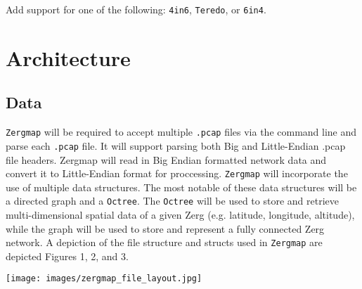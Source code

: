 \documentclass[12pt]{article}
\begin{document}
Add support for one of the following: \lstinline|4in6|, \lstinline|Teredo|, or \lstinline|6in4|.
\pagebreak %

\section{Architecture}
\subsection{Data}

\lstinline|Zergmap| will be required to accept multiple \lstinline|.pcap| files via the command line and parse each \lstinline|.pcap| file. It will support parsing both Big and Little-Endian .pcap file headers. Zergmap will read in Big Endian formatted network data and convert it to Little-Endian format for proccessing. 
\newline
\newline
\lstinline|Zergmap| will incorporate the use of multiple data structures. The most notable of these data structures will be a directed graph and a \lstinline|Octree|. The \lstinline|Octree| will be used to store and retrieve multi-dimensional spatial data of a given Zerg (e.g. latitude, longitude, altitude), while the graph will be used to store and represent a fully connected Zerg network. A depiction of the file structure and structs used in \lstinline|Zergmap| are depicted Figures 1, 2, and 3.
\newline
\newline
\graphicspath{ {./images/} }
\texttt{[image: images/zergmap\_file\_layout.jpg]}
\end{document}
